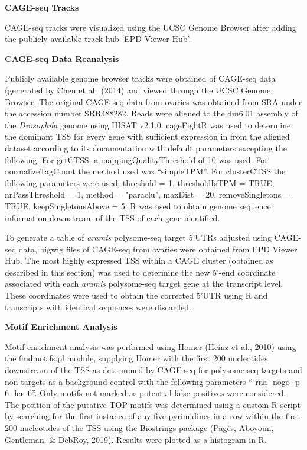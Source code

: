 \documentclass[12pt,oneside]{reedthesis}
\begin{document}
\textbf{CAGE-seq Tracks}

CAGE-seq tracks were visualized using the UCSC Genome Browser after
adding the publicly available track hub 'EPD Viewer Hub'.

\textbf{CAGE-seq Data Reanalysis}

Publicly available genome browser tracks were obtained of CAGE-seq data
(generated by Chen et al.~(2014) and viewed through the UCSC Genome
Browser. The original CAGE-seq data from ovaries was obtained from SRA
under the accession number SRR488282. Reads were aligned to the dm6.01
assembly of the \emph{Drosophila} genome using HISAT v2.1.0. cageFightR was
used to determine the dominant TSS for every gene with sufficient
expression in from the aligned dataset according to its documentation
with default parameters excepting the following: For getCTSS, a
mappingQualityThreshold of 10 was used. For normalizeTagCount the method
used was ``simpleTPM''. For clusterCTSS the following parameters were
used; threshold = 1, thresholdIsTPM = TRUE, nrPassThreshold = 1, method
= "paraclu", maxDist = 20, removeSingletons = TRUE,
keepSingletonsAbove = 5. R was used to obtain genome sequence
information downstream of the TSS of each gene identified.

To generate a table of \emph{aramis} polysome-seq target 5'UTRs adjusted
using CAGE-seq data, bigwig files of CAGE-seq from ovaries were obtained
from EPD Viewer Hub. The most highly expressed TSS within a CAGE cluster
(obtained as described in this section) was used to determine the new
5'-end coordinate associated with each \emph{aramis} polysome-seq target gene
at the transcript level. These coordinates were used to obtain the
corrected 5'UTR using R and transcripts with identical sequences were
discarded.

\textbf{Motif Enrichment Analysis}

Motif enrichment analysis was performed using Homer
(Heinz et al., 2010) using the
findmotifs.pl module, supplying Homer with the first 200 nucleotides
downstream of the TSS as determined by CAGE-seq for polysome-seq targets
and non-targets as a background control with the following parameters
``-rna -nogo -p 6 -len 6''. Only motifs not marked as potential false
positives were considered. The position of the putative TOP motifs was
determined using a custom R script by searching for the first instance
of any five pyrimidines in a row within the first 200 nucleotides of the
TSS using the Biostrings package
(Pagès, Aboyoun, Gentleman, \& DebRoy, 2019). Results were plotted as
a histogram in R.
\end{document}
